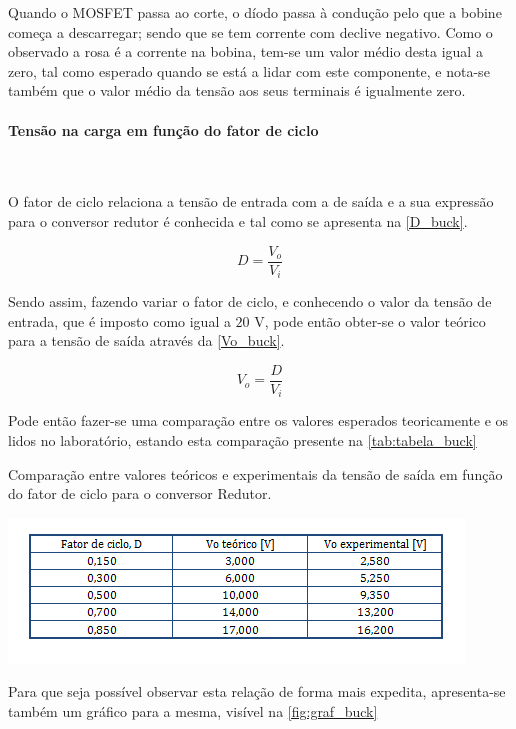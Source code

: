 \documentclass[a4paper,11pt]{article}
\numberwithin{equation}{section}
\begin{document}
Quando o MOSFET passa ao corte, o díodo passa à condução pelo que a bobine começa a descarregar; sendo que se tem corrente com declive negativo. Como o observado a rosa é a corrente na bobina, tem-se um valor médio desta igual a zero, tal como esperado quando se está a lidar com este componente, e nota-se também que o valor médio da tensão aos seus terminais é igualmente zero.

\paragraph{Tensão na carga em função do fator de ciclo}\mbox{}\

O fator de ciclo relaciona a tensão de entrada com a de saída e a sua expressão para o conversor redutor é conhecida e tal como se apresenta na \autoref{D_buck}.

\begin{equation}
	D= \frac{V_o}{V_i} \label{D_buck}
\end{equation}

Sendo assim, fazendo variar o fator de ciclo, e conhecendo o valor da tensão de entrada, que é imposto como igual a $20$ V, pode então obter-se o valor teórico para a tensão de saída através da \autoref{Vo_buck}.

\begin{equation}
V_o= \frac{D}{V_i} \label{Vo_buck}
\end{equation}

Pode então fazer-se uma comparação entre os valores esperados teoricamente e os lidos no laboratório, estando esta comparação presente na \autoref{tab:tabela_buck}

\begin{table}[!htb]
	\centering
	\caption{Comparação entre valores teóricos e experimentais da tensão de saída em função do fator de ciclo para o conversor Redutor.}
	\includegraphics[width=0.8\linewidth]{teoricas/tabela_buck}
	\label{tab:tabela_buck}
\end{table}

Para que seja possível observar esta relação de forma mais expedita, apresenta-se também um gráfico para a mesma, visível na \autoref{fig:graf_buck}
\end{document}
